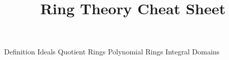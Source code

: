 \documentclass[14pt]{extarticle}
\title{Ring Theory Cheat Sheet}
\begin{document}
	\maketitle

	\begin{outline}		
		\1	Definition
		\1	Ideals
		\1	Quotient Rings
		\1	Polynomial Rings
		\1	Integral Domains
	\end{outline}
\end{document}
